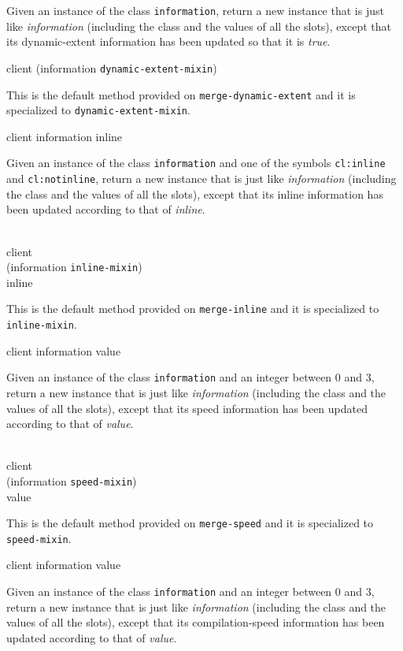 Given an instance of the class \texttt{information}, return a
new instance that is just like \textit{information}
(including the class and the values of all the slots), except that its
dynamic-extent information has been updated so that it is \emph{true}.

{\footnotesize
{} {client (information {\tt dynamic-extent-mixin})}
}

This is the default method provided on
\texttt{merge-dynamic-extent} and it is specialized to
\texttt{dynamic-extent-mixin}.

 {client information inline}

Given an instance of the class \texttt{information} and one
of the symbols \texttt{cl:inline} and \texttt{cl:notinline},
return a new instance that is just like
\textit{information} (including the class and the values of
all the slots), except that its inline information has been updated
according to that of \textit{inline}.

\\
           {client\\
            (information {\tt inline-mixin})\\
            inline}

This is the default method provided on \texttt{merge-inline}
and it is specialized to \texttt{inline-mixin}.

 {client information value}

Given an instance of the class \texttt{information} and an
integer between $0$ and $3$, return a new instance that is just like
\textit{information} (including the class and the values of
all the slots), except that its speed information has been updated
according to that of \textit{value}.

\\
           {client\\
            (information {\tt speed-mixin})\\
            value}

This is the default method provided on \texttt{merge-speed} and it is
specialized to \texttt{speed-mixin}.

 {client information value}

Given an instance of the class \texttt{information} and an
integer between $0$ and $3$, return a new instance that is just like
\textit{information} (including the class and the values of
all the slots), except that its compilation-speed information has been
updated according to that of \textit{value}.

